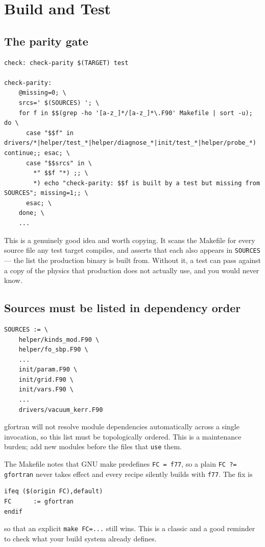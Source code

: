 \section{Build and Test}
\label{ch:build}

\subsection{The parity gate}

\begin{lstlisting}
check: check-parity $(TARGET) test

check-parity:
	@missing=0; \
	srcs=' $(SOURCES) '; \
	for f in $$(grep -ho '[a-z_]*/[a-z_]*\.F90' Makefile | sort -u); do \
	  case "$$f" in drivers/*|helper/test_*|helper/diagnose_*|init/test_*|helper/probe_*) continue;; esac; \
	  case "$$srcs" in \
	    *" $$f "*) ;; \
	    *) echo "check-parity: $$f is built by a test but missing from SOURCES"; missing=1;; \
	  esac; \
	done; \
	...
\end{lstlisting}

This is a genuinely good idea and worth copying. It scans the Makefile for
every source file any test target compiles, and asserts that each also appears
in \texttt{SOURCES} --- the list the production binary is built from. Without
it, a test can pass against a copy of the physics that production does not
actually use, and you would never know.

\subsection{Sources must be listed in dependency order}

\begin{lstlisting}
SOURCES := \
	helper/kinds_mod.F90 \
	helper/fo_sbp.F90 \
	...
	init/param.F90 \
	init/grid.F90 \
	init/vars.F90 \
	...
	drivers/vacuum_kerr.F90
\end{lstlisting}

gfortran will not resolve module dependencies automatically across a single
invocation, so this list must be topologically ordered. This is a maintenance
burden; add new modules before the files that \texttt{use} them.

\gotcha
The Makefile notes that GNU make predefines \texttt{FC = f77}, so a plain
\texttt{FC ?= gfortran} never takes effect and every recipe silently builds
with \texttt{f77}. The fix is
\begin{lstlisting}
ifeq ($(origin FC),default)
FC      := gfortran
endif
\end{lstlisting}
so that an explicit \texttt{make FC=...} still wins. This is a classic and a
good reminder to check what your build system already defines.

